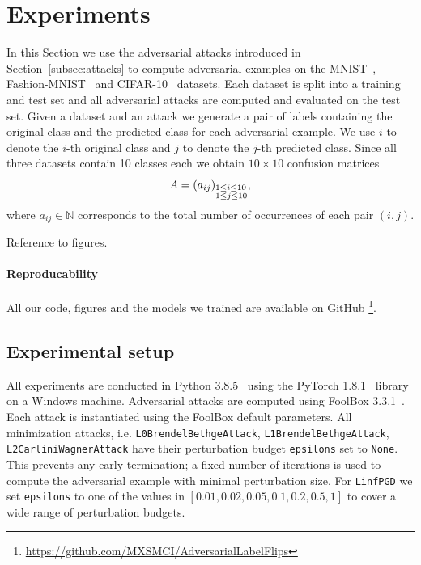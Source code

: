 \documentclass{article}
\begin{document}
\section{Experiments}
\label{sec:experiments}

In this Section we use the adversarial attacks introduced in Section~\ref{subsec:attacks} to compute adversarial examples on the MNIST~\cite{deng2012mnist}, Fashion-MNIST~\cite{xiao2017fashion} and CIFAR-10~\cite{krizhevsky2009learning} datasets. Each dataset is split into a training and test set and all adversarial attacks are computed and evaluated on the test set. Given a dataset and an attack we generate a pair of labels containing the original class and the predicted class for each adversarial example. We use $i$ to denote the $i$-th original class and $j$ to denote the $j$-th predicted class. Since all three datasets contain 10 classes each we obtain $10\times10$ confusion matrices
\[A=(a_{ij})_{\begin{subarray}{l} 1\le i\le 10 \\ 1\le j\le 10\end{subarray}},\]
where $a_{ij}\in\mathbb{N}$ corresponds to the total number of occurrences of each pair $(i,j)$.


\noindent Reference to figures.

\paragraph{Reproducability}All our code, figures and the models we trained are available on GitHub \footnote{\url{https://github.com/MXSMCI/AdversarialLabelFlips}}.

\subsection{Experimental setup}
All experiments are conducted in Python 3.8.5~\cite{van1995python} using the PyTorch 1.8.1~\cite{pytorch} library on a Windows machine. Adversarial attacks are computed using FoolBox 3.3.1~\cite{rauber2017foolbox}. Each attack is instantiated using the FoolBox default parameters. All minimization attacks, i.e. \texttt{L0BrendelBethgeAttack}, \texttt{L1BrendelBethgeAttack}, \texttt{L2CarliniWagnerAttack} have their perturbation budget \texttt{epsilons} set to \texttt{None}. This prevents any early termination; a fixed number of iterations is used to compute the adversarial example with minimal perturbation size. For \texttt{LinfPGD} we set \texttt{epsilons} to one of the values in $[0.01, 0.02, 0.05, 0.1, 0.2, 0.5, 1]$ to cover a wide range of perturbation budgets.
\end{document}
